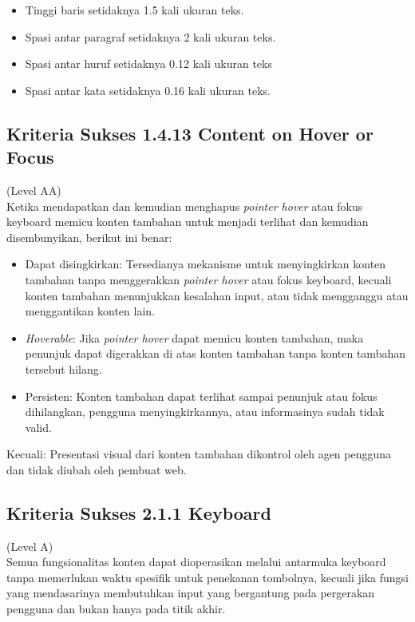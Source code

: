 \begin{itemize}
	\item Tinggi baris setidaknya 1.5 kali ukuran teks.
	\item Spasi antar paragraf setidaknya 2 kali ukuran teks.
	\item Spasi antar huruf setidaknya 0.12 kali ukuran teks
	\item Spasi antar kata setidaknya 0.16 kali ukuran teks.
\end{itemize}

\subsection{Kriteria Sukses 1.4.13 Content on Hover or Focus}
\label{subsec:kriteria_1.4.13}
(Level AA) \\

Ketika mendapatkan dan kemudian menghapus \textit{pointer hover} atau fokus keyboard memicu konten tambahan untuk menjadi terlihat dan kemudian disembunyikan, berikut ini benar:

\begin{itemize}
	\item Dapat disingkirkan: Tersedianya mekanisme untuk menyingkirkan konten tambahan tanpa menggerakkan \textit{pointer hover} atau fokus keyboard, kecuali konten tambahan menunjukkan kesalahan input, atau tidak mengganggu atau menggantikan konten lain.
	\item \textit{Hoverable}: Jika \textit{pointer hover} dapat memicu konten tambahan, maka penunjuk dapat digerakkan di atas konten tambahan tanpa konten tambahan tersebut hilang.
	\item Persisten: Konten tambahan dapat terlihat sampai penunjuk atau fokus dihilangkan, pengguna menyingkirkannya, atau informasinya sudah tidak valid.
\end{itemize}

Kecuali: Presentasi visual dari konten tambahan dikontrol oleh agen pengguna dan tidak diubah oleh pembuat web.


\subsection{Kriteria Sukses 2.1.1 Keyboard}
\label{subsec:kriteria_2.1.1}
(Level A) \\

Semua fungsionalitas konten dapat dioperasikan melalui antarmuka keyboard tanpa memerlukan waktu spesifik untuk penekanan tombolnya, kecuali jika fungsi yang mendasarinya membutuhkan input yang bergantung pada pergerakan pengguna dan bukan hanya pada titik akhir.


